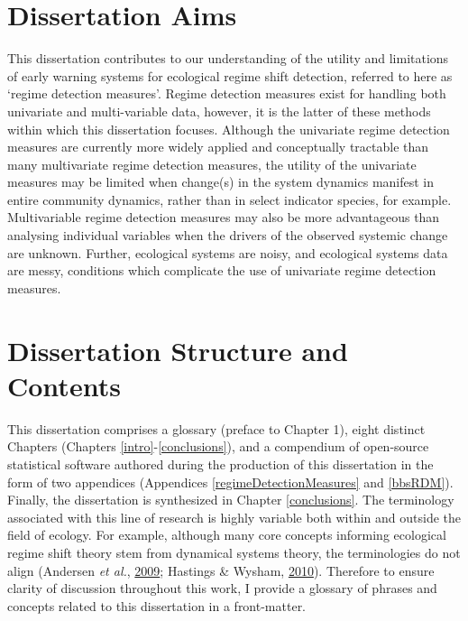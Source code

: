 \documentclass[12pt,twoside,openany]{reedthesis}
\begin{document}
\hypertarget{dissertation-aims}{%
\section{Dissertation Aims}\label{dissertation-aims}}

This dissertation contributes to our understanding of the utility and limitations of early warning systems for ecological regime shift detection, referred to here as `regime detection measures'. Regime detection measures exist for handling both univariate and multi-variable data, however, it is the latter of these methods within which this dissertation focuses. Although the univariate regime detection measures are currently more widely applied and conceptually tractable than many multivariate regime detection measures, the utility of the univariate measures may be limited when change(s) in the system dynamics manifest in entire community dynamics, rather than in select indicator species, for example. Multivariable regime detection measures may also be more advantageous than analysing individual variables when the drivers of the observed systemic change are unknown. Further, ecological systems are noisy, and ecological systems data are messy, conditions which complicate the use of univariate regime detection measures.

\hypertarget{dissertation-structure-and-contents}{%
\section{Dissertation Structure and Contents}\label{dissertation-structure-and-contents}}

This dissertation comprises a glossary (preface to Chapter 1), eight distinct Chapters (Chapters \ref{intro}-\ref{conclusions}), and a compendium of open-source statistical software authored during the production of this dissertation in the form of two appendices (Appendices \ref{regimeDetectionMeasures} and \ref{bbsRDM}). Finally, the dissertation is synthesized in Chapter \ref{conclusions}. The terminology associated with this line of research is highly variable both within and outside the field of ecology. For example, although many core concepts informing ecological regime shift theory stem from dynamical systems theory, the terminologies do not align (Andersen \emph{et al.}, \protect\hyperlink{ref-andersen_ecological_2009}{2009}; Hastings \& Wysham, \protect\hyperlink{ref-hastings2010regime}{2010}). Therefore to ensure clarity of discussion throughout this work, I provide a glossary of phrases and concepts related to this dissertation in a front-matter.
\end{document}
